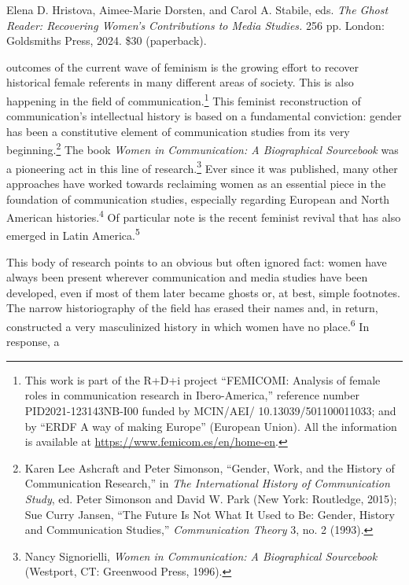 \documentclass{tufte-handout}
\begin{document}
\begin{titlepage}
\noindent Elena D. Hristova, Aimee-Marie Dorsten, and Carol A.
Stabile, eds. \emph{The Ghost Reader: Recovering
Women's Contributions to Media Studies.} 256 pp.
London: Goldsmiths Press, 2024. \$30 (paperback).

\vspace{1em}

 outcomes of the current wave of feminism is the growing
effort to recover historical female referents in many different areas of
society. This is also happening in the field of communication.\footnote{This work is part of the R+D+i project ``FEMICOMI: Analysis of female roles in communication research in Ibero-America,'' reference number PID2021-123143NB-I00 funded by MCIN/AEI/ 10.13039/501100011033; and by ``ERDF A way of making Europe'' (European Union). All the information is available at \url{https://www.femicom.es/en/home-en}.} This
feminist reconstruction of communication's intellectual history is based
on a fundamental conviction: gender has been a constitutive element of
communication studies from its very beginning.\footnote{Karen Lee
  Ashcraft and Peter Simonson, ``Gender, Work, and the History of
  Communication Research,'' in \emph{The International History of
  Communication Study}, ed. Peter Simonson and David W. Park (New York:
  Routledge, 2015); Sue Curry Jansen, ``The Future Is Not What It Used
  to Be: Gender, History and Communication Studies,''
  \emph{Communication Theory} 3, no. 2 (1993).} The book \emph{Women in
Communication: A Biographical Sourcebook} was a pioneering act in this
line of research.\footnote{Nancy Signorielli, \emph{Women in
  Communication: A Biographical Sourcebook} (Westport, CT: Greenwood
  Press, 1996).} Ever since it was published, many other approaches have
worked towards reclaiming women as an essential piece in the foundation
of communication studies,  especially regarding European and North
American histories.\textsuperscript{4} Of particular note is the recent feminist
revival that has also emerged in Latin America.\textsuperscript{5}

  This body of research points to an obvious but often ignored fact: women
have always been present wherever communication and media studies have
been developed, even if most of them later became ghosts or, at best,
simple footnotes. The narrow historiography of the field has erased
their names and, in return, constructed a very masculinized history in
which women have no place.\textsuperscript{6} In
response, a

\enlargethispage{2\baselineskip}

\vspace*{2em}



 \end{titlepage}
\end{document}

